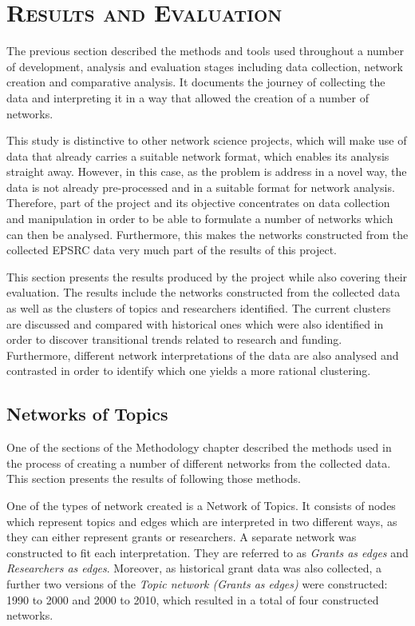 \chapter{\textsc{Results and Evaluation}}
\label{chapterlabel5}

The previous section described the methods and tools used throughout a number of development, analysis and evaluation stages including data collection, network creation and comparative analysis. It documents the journey of collecting the data and interpreting it in a way that allowed the creation of a number of networks.

This study is distinctive to other network science projects, which will make use of data that already carries a suitable network format, which enables its analysis straight away. However, in this case, as the problem is address in a novel way, the data is not already pre-processed and in a suitable format for network analysis. Therefore, part of the project and its objective concentrates on data collection and manipulation in order to be able to formulate a number of networks which can then be analysed. Furthermore, this makes the networks constructed from the collected EPSRC data very much part of the results of this project.

This section presents the results produced by the project while also covering their evaluation. The results include the networks constructed from the collected data as well as the clusters of topics and researchers identified. The current clusters are discussed and compared with historical ones which were also identified in order to discover transitional trends related to research and funding. Furthermore, different network interpretations of the data are also analysed and contrasted in order to identify which one yields a more rational clustering.

\section{Networks of Topics}

One of the sections of the Methodology chapter described the methods used in the process of creating a number of different networks from the collected data. This section presents the results of following those methods.

One of the types of network created is a Network of Topics. It consists of nodes which represent topics and edges which are interpreted in two different ways, as they can either represent grants or researchers. A separate network was constructed to fit each interpretation. They are referred to as \textit{Grants as edges} and \textit{Researchers as edges}. Moreover, as historical grant data was also collected, a further two versions of the \textit{Topic network (Grants as edges)} were constructed: 1990 to 2000 and 2000 to 2010, which resulted in a total of four constructed networks.

